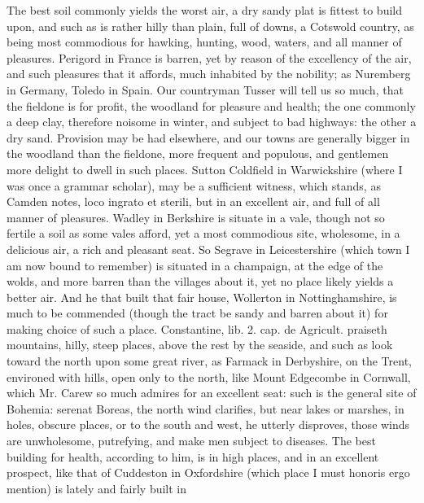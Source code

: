 {The best soil commonly yields the worst air, a dry sandy plat is
fittest to build upon, and such as is rather hilly than plain, full of
downs, a Cotswold country, as being most commodious for hawking,
hunting, wood, waters, and all manner of pleasures. Perigord in France
is barren, yet by reason of the excellency of the air, and such
pleasures that it affords, much inhabited by the nobility; as Nuremberg
in Germany, Toledo in Spain. Our countryman Tusser will tell us so
much, that the fieldone is for profit, the woodland for pleasure and
health; the one commonly a deep clay, therefore noisome in winter, and
subject to bad highways: the other a dry sand. Provision may be had
elsewhere, and our towns are generally bigger in the woodland than the
fieldone, more frequent and populous, and gentlemen more delight to
dwell in such places. Sutton \label{mention:coldfield}Coldfield in Warwickshire (where I was
once a grammar scholar), may be a sufficient witness, which stands, as
Camden notes, loco ingrato et sterili, but in an excellent air, and
full of all manner of pleasures. Wadley in Berkshire is situate
in a vale, though not so fertile a soil as some vales afford, yet a
most commodious site, wholesome, in a delicious air, a rich and
pleasant seat. So Segrave in Leicestershire (which town I am now
bound to remember) is situated in a champaign, at the edge of the
wolds, and more barren than the villages about it, yet no place likely
yields a better air. And he that built that fair house, Wollerton
in Nottinghamshire, is much to be commended (though the tract be sandy
and barren about it) for making choice of such a place. Constantine,
lib. 2. cap. de Agricult. praiseth mountains, hilly, steep places,
above the rest by the seaside, and such as look toward the north
upon some great river, as  Farmack in Derbyshire, on the Trent,
environed with hills, open only to the north, like Mount Edgecombe in
Cornwall, which Mr. Carew so much admires for an excellent seat:
such is the general site of Bohemia: serenat Boreas, the north wind
clarifies, but near lakes or marshes, in holes, obscure places,
or to the south and west, he utterly disproves, those winds are
unwholesome, putrefying, and make men subject to diseases. The best
building for health, according to him, is in  high places, and in
an excellent prospect, like that of Cuddeston in Oxfordshire (which
place I must honoris ergo mention) is lately and fairly built in
}
